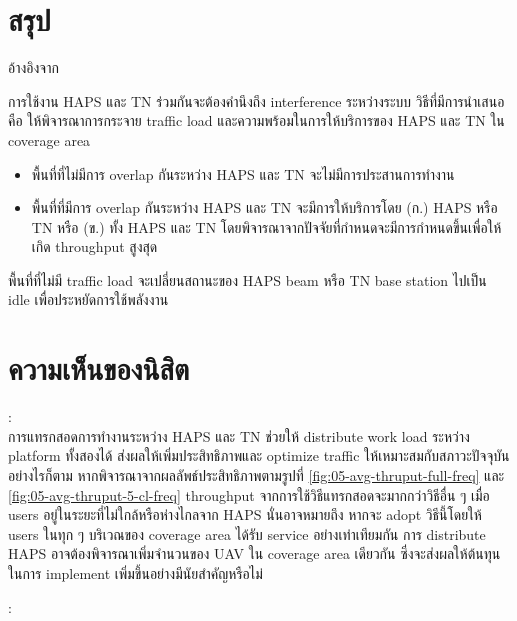 \section{สรุป}

อ้างอิงจาก \cite[Interference Coordination Method for Integrated HAPS-Terrestrial Networks]{liu2021interference}

การใช้งาน HAPS และ TN ร่วมกันจะต้องคำนึงถึง interference ระหว่างระบบ
วิธีที่มีการนำเสนอคือ ให้พิจารณาการกระจาย traffic load และความพร้อมในการให้บริการของ
HAPS และ TN ใน coverage area

\begin{itemize}
    \item พื้นที่ที่ไม่มีการ overlap กันระหว่าง HAPS และ TN จะไม่มีการประสานการทำงาน
    \item พื้นที่ที่มีการ overlap กันระหว่าง HAPS และ TN จะมีการให้บริการโดย (ก.) HAPS หรือ TN หรือ (ข.) ทั้ง HAPS และ TN
            โดยพิจารณาจากปัจจัยที่กำหนดจะมีการกำหนดขึ้นเพื่อให้เกิด throughput สูงสุด
\end{itemize}

พื้นที่ที่ไม่มี traffic load จะเปลี่ยนสถานะของ HAPS beam หรือ TN base station ไปเป็น idle เพื่อประหยัดการใช้พลังงาน

\section{ความเห็นของนิสิต}

\begin{multicols}{2}
\begin{minipage}{0.4\textwidth}
\textbf{\authorAName}:\\
การแทรกสอดการทำงานระหว่าง HAPS และ TN ช่วยให้ distribute work load
ระหว่าง platform ทั้งสองได้ ส่งผลให้เพิ่มประสิทธิภาพและ optimize traffic
ให้เหมาะสมกับสภาวะปัจจุบัน อย่างไรก็ตาม หากพิจารณาจากผลลัพธ์ประสิทธิภาพตามรูปที่ 
\ref{fig:05-avg-thruput-full-freq} และ \ref{fig:05-avg-thruput-5-cl-freq}
throughput จากการใช้วิธีแทรกสอดจะมากกว่าวิธีอื่น ๆ เมื่อ users อยู่ในระยะที่ไม่ใกล้หรือห่างไกลจาก HAPS
นั่นอาจหมายถึง หากจะ adopt วิธีนี้โดยให้ users ในทุก ๆ บริเวณของ coverage area
ได้รับ service อย่างเท่าเทียมกัน การ distribute HAPS อาจต้องพิจารณาเพิ่มจำนวนของ
UAV ใน coverage area เดียวกัน ซึ่งจะส่งผลให้ต้นทุนในการ implement เพิ่มขึ้นอย่างมีนัยสำคัญหรือไม่
\end{minipage}
\columnbreak
\begin{minipage}{0.4\textwidth}
\textbf{\authorBName}:\\
\end{minipage}
\end{multicols}

